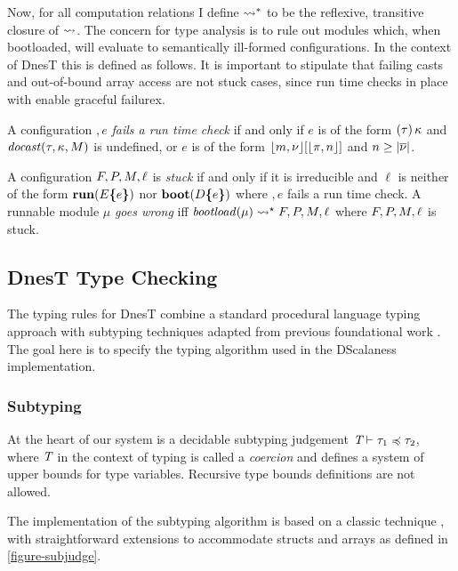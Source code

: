 Now, for all computation relations I define $\leadsto^*$ to be the reflexive, transitive closure
of $\leadsto$. The concern for type analysis is to rule out modules which, when bootloaded, will
evaluate to semantically ill-formed configurations. In the context of DnesT this is defined as
follows. It is important to stipulate that failing casts and out-of-bound array access are not
stuck cases, since run time checks in place with enable graceful failurex.
\begin{definition}
  A configuration $\bm, e$ \emph{fails a run time check} if and only if $e$ is of the form
  $(\tau)\,\kappa$ and $\mathit{docast}(\tau,\kappa,M)$ is undefined, or $e$ is of the form
  $\lfloor m,{\nu} \rfloor[\lfloor \pi,n \rfloor]$ and $n\ge|\overline{{\nu}}|$.
\end{definition}

\begin{definition}
  \label{def-runnable}
  A configuration $F, P, M, \ell$ is \emph{stuck} if and only if it is irreducible
  and $\ell$ is neither of the form $\mathbf{run}(E\textup{\textbf{\{}} e\textup{\textbf{\}}})$ nor $\mathbf{boot}(D\textup{\textbf{\{}} e\textup{\textbf{\}}})$
  where $\bm, e$ fails a run time check. A runnable module $\mu$ \emph{goes wrong} iff
  $\mathit{bootload}(\mu) \leadsto^\star F, P, M, \ell $ where $F, P, M, \ell$
  is stuck.
\end{definition}

\subsection{DnesT Type Checking} 
\label{section-nesttyping}

The typing rules for DnesT combine a standard procedural language typing approach with subtyping
techniques adapted from previous foundational work \cite{FramedML,Ghelli199875}. The goal here
is to specify the typing algorithm used in the DScalaness implementation.

\subsubsection{Subtyping}

At the heart of our system is a decidable subtyping judgement $\textit{T} \vdash \tau_1 \preccurlyeq \tau_2$,
where $\textit{T}$ in the context of typing is called a \emph{coercion} and defines a system of
upper bounds for type variables. Recursive type bounds definitions are not allowed.

The implementation of the subtyping algorithm is based on a classic technique
\cite{Ghelli199875}, with straightforward extensions to accommodate structs and arrays as
defined in \autoref{figure-subjudge}.

